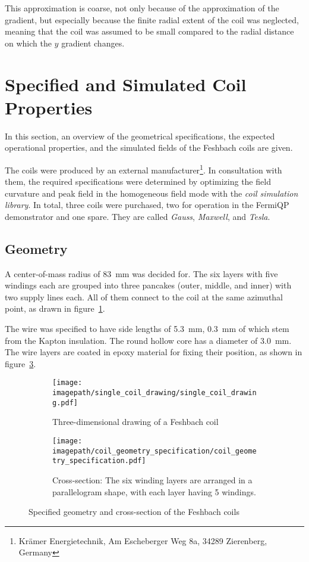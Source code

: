 This approximation is coarse, not only because of the approximation of the gradient, but especially because the finite radial extent of the coil was neglected, meaning that the coil was assumed to be small compared to the radial distance on which the $y$ gradient changes.


\section{Specified and Simulated Coil Properties}\label{ch:coil_properties}
In this section, an overview of the geometrical specifications, the expected operational properties, and the simulated fields of the Feshbach coils are given.

The coils were produced by an external manufacturer\footnote{Krämer Energietechnik, Am Escheberger Weg 8a, 34289 Zierenberg, Germany}. In consultation with them, the required specifications were determined by optimizing the field curvature and peak field in the homogeneous field mode with the \textit{coil simulation library}. In total, three coils were purchased, two for operation in the FermiQP demonstrator and one spare. They are called \textit{Gauss}, \textit{Maxwell}, and \textit{Tesla}.


\subsection*{Geometry}
A center-of-mass radius of \SI{83}{\milli\meter} was decided for. The six layers with five windings each are grouped into three pancakes (outer, middle, and inner) with two supply lines each. All of them connect to the coil at the same azimuthal point, as drawn in figure~\ref{fig:single_coil_drawing}. 

The wire was specified to have side lengths of \SI{5.3}{\milli\meter}, \SI{0.3}{\milli\meter} of which stem from the Kapton insulation. The round hollow core has a diameter of \SI{3.0}{\milli\meter}. The wire layers are coated in epoxy material for fixing their position, as shown in figure~\ref{fig:coil_geometry_specification}.

\begin{figure}
    \centering
    \begin{subfigure}[t]{0.48\textwidth}
        \centering
        \texttt{[image: \\imagepath/single\_coil\_drawing/single\_coil\_drawing.pdf]}
        \caption{Three-dimensional drawing of a Feshbach coil}
        \label{fig:single_coil_drawing}
    \end{subfigure}
    \hspace{0.03\textwidth}
    \begin{subfigure}[t]{0.48\textwidth}
        \centering
        \texttt{[image: \\imagepath/coil\_geometry\_specification/coil\_geometry\_specification.pdf]}
        \caption{Cross-section: The six winding layers are arranged in a parallelogram shape, with each layer having 5 windings.}
        \label{fig:coil_geometry_specification}
    \end{subfigure}
    \caption{Specified geometry and cross-section of the Feshbach coils}
\end{figure}

